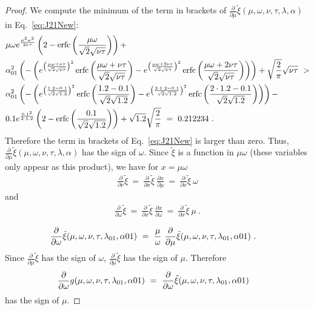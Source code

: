 \documentclass{article}
\newcommand\xinn{{\tilde \xi}}
\DeclareMathOperator{\erfc}{erfc}
\begin{document}
\begin{proof}
We compute the minimum of the term in brackets of $\frac{\partial
}{\partial \mu }
\xinn(\mu,\omega,\nu,\tau,\lambda ,\alpha )$
in Eq.~\eqref{eq:J21New}:  
\begin{align}
&\mu \omega e^{\frac{\mu^2 \omega^2}{2 \nu \tau}} \left(2-\erfc\left(\frac{\mu \omega}{\sqrt{2} \sqrt{\nu \tau}}\right)\right)+ \\ \nonumber 
&\alpha_{\rm 01}^2 \left(-\left(e^{\left(\frac{\mu \omega+\nu \tau}{\sqrt{2} \sqrt{\nu \tau}}\right)^2} 
\erfc\left(\frac{\mu \omega+\nu \tau}{\sqrt{2} \sqrt{\nu \tau}}\right)-e^{\left(\frac{\mu \omega+2 \nu \tau}{\sqrt{2} \sqrt{\nu \tau}}\right)^2} 
\erfc\left(\frac{\mu \omega+2 \nu \tau}{\sqrt{2} \sqrt{\nu \tau}}\right)\right)\right)+ \sqrt{\frac{2}{\pi }} \sqrt{\nu \tau} \ > \\ \nonumber
&\alpha_{\rm 01}^2 \left(-\left(e^{\left(\frac{1.2 -0.1}{\sqrt{2} \sqrt{1.2}}\right)^2} 
\erfc\left(\frac{1.2-0.1}{\sqrt{2} \sqrt{1.2}}\right)-e^{\left(\frac{2 \cdot 1.2-0.1}{\sqrt{2} \sqrt{1.2}}\right)^2} 
\erfc\left(\frac{2 \cdot 1.2-0.1}{\sqrt{2} \sqrt{1.2}}\right)\right)\right)-\\ \nonumber 
&0.1 e^{\frac{0.1^2}{2 \cdot 1.2}} \left(2-\erfc\left(\frac{0.1}{\sqrt{2} \sqrt{1.2}}\right)\right)+\sqrt{1.2} \sqrt{\frac{2}{\pi }}
\ = \ 0.212234 \ .
\end{align}
Therefore the term in brackets  of Eq.~\eqref{eq:J21New}
is larger than zero.
Thus, $\frac{\partial }{\partial \mu }
\xinn(\mu,\omega,\nu,\tau,\lambda ,\alpha )$
has the sign of $\omega$.
Since $\xinn$ is a function in $\mu \omega$
(these variables only appear as this product), we
have for $x=\mu \omega$
\begin{align}
\frac{\partial}{\partial \nu}\xinn \ = \ \frac{\partial}{\partial
x}\xinn \ \frac{\partial x}{\partial
\mu} \ = \ \frac{\partial}{\partial
x}\xinn \ \omega
\end{align}
and 
\begin{align}
\frac{\partial}{\partial
\omega}\xinn \ = \ \frac{\partial}{\partial
x}\xinn \ \frac{\partial x}{\partial
\omega} \ = \ \frac{\partial}{\partial
x}\xinn \ \mu \ .
\end{align}

\begin{align}
\frac{\partial}{\partial
\omega}\xinn(\mu,\omega,\nu,\tau,\lambda_{\rm 01},\alpha{\rm 01}) \ &= \ \frac{\mu}{\omega} \ \frac{\partial}{\partial
\mu}\xinn(\mu,\omega,\nu,\tau,\lambda_{\rm 01},\alpha{\rm 01}) \ .
\end{align}
Since $\frac{\partial}{\partial
\mu}\xinn$ has the sign of $\omega$, 
 $\frac{\partial}{\partial
\mu}\xinn$ has the sign of $\mu$.
Therefore
\begin{align}
\frac{\partial}{\partial
\omega}g(\mu,\omega,\nu,\tau,\lambda_{\rm 01},\alpha{\rm 01} ) \ &= \ 
\frac{\partial}{\partial
\omega}\xinn(\mu,\omega,\nu,\tau,\lambda_{\rm 01},\alpha{\rm 01} )
\end{align}
has the sign of $\mu$.



\end{proof}
\end{document}
